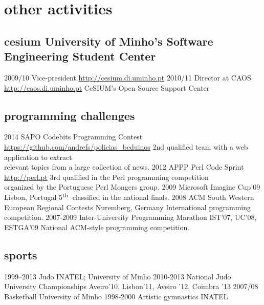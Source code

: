 \documentclass[a4paper]{friggeri-cv}
\begin{document}
\section{other activities}
\subsection{cesium {\normalfont\small University of Minho's Software Engineering Student Center}}{}
\begin{entrylist}
  \entry
    {2009/10}
    {Vice-president}
    {\href{http://cesium.di.uminho.pt}{http://cesium.di.uminho.pt}}
    {\vspace{-.8cm}}
  \entry
    {2010/11}
    {Director at CAOS}
    {\href{http://caos.di.uminho.pt}{http://caos.di.uminho.pt}}
    {CeSIUM's Open Source Support Center}
\end{entrylist}

\subsection{programming challenges}{}
\begin{entrylist}
  \entry
    {2014}
    {SAPO Codebits Programming Contest}
    {\href{https://github.com/andrefs/policias\_beduinos}{https://github.com/andrefs/policias\_beduinos}}
    {2nd qualified team with a web application to extract\\
    relevant topics from a large collection of news.}
  \entry
    {2012}
    {APPP Perl Code Sprint}
    {\href{http://perl.pt}{http://perl.pt}}
    {3rd qualified in the Perl programming competition\\organized by the Portuguese Perl Mongers group.}
  \entry
    {2009}
    {Microsoft Imagine Cup'09}
    {Lisbon, Portugal}
    {5$^{\footnotesize\textrm{th}}$~classified in the national finals.}
  \entry
    {2008}
    {ACM South Western European Regional Contests}
    {Nuremberg, Germany}
    {International programming competition.}
  \entry
    {2007-2009}
    {Inter-University Programming Marathon}
    {IST'07, UC'08, ESTGA'09}
    {National ACM-style programming competition.}
\end{entrylist}

\subsection{sports}{}
\begin{entrylist}
  \entry
    {1999--2013}
    {Judo}
    {INATEL; University of Minho}
    {\vspace{-.8cm}}
  \entry
    {2010-2013}
    {National Judo University Championships}
    {Aveiro'10, Lisbon'11, Aveiro '12, Coimbra '13}
    {\vspace{-.8cm}}
  \entry
    {2007/08}
    {Basketball}
    {University of Minho}
    {\vspace{-.8cm}}
  \entry
    {1998-2000}
    {Artistic gymnastics}
    {INATEL}
    {}
\end{entrylist}
\end{document}
